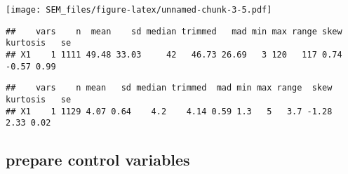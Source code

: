 \documentclass[]{article}
\newenvironment{Shaded}{\begin{snugshade}}{\end{snugshade}}
\newcommand{\DataTypeTok}[1]{\textcolor[rgb]{0.13,0.29,0.53}{#1}}
\newcommand{\KeywordTok}[1]{\textcolor[rgb]{0.13,0.29,0.53}{\textbf{#1}}}
\newcommand{\NormalTok}[1]{#1}
\newcommand{\OperatorTok}[1]{\textcolor[rgb]{0.81,0.36,0.00}{\textbf{#1}}}
\newcommand{\OtherTok}[1]{\textcolor[rgb]{0.56,0.35,0.01}{#1}}
\newcommand{\StringTok}[1]{\textcolor[rgb]{0.31,0.60,0.02}{#1}}
\begin{document}
\texttt{[image: SEM\_files/figure-latex/unnamed-chunk-3-5.pdf]}

\begin{Shaded}
\end{Shaded}

\begin{verbatim}
##    vars    n  mean    sd median trimmed   mad min max range skew kurtosis   se
## X1    1 1111 49.48 33.03     42   46.73 26.69   3 120   117 0.74    -0.57 0.99
\end{verbatim}

\begin{Shaded}
\end{Shaded}

\begin{verbatim}
##    vars    n mean   sd median trimmed  mad min max range  skew kurtosis   se
## X1    1 1129 4.07 0.64    4.2    4.14 0.59 1.3   5   3.7 -1.28     2.33 0.02
\end{verbatim}

\hypertarget{prepare-control-variables}{%
\subsection{prepare control variables}\label{prepare-control-variables}}

\begin{Shaded}
\end{Shaded}
\end{document}

